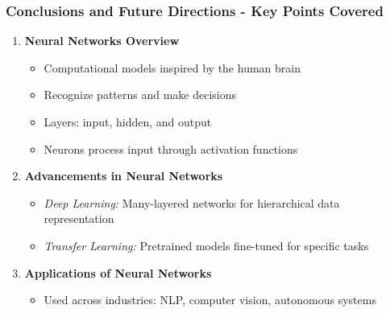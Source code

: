 \documentclass[aspectratio=169]{beamer}
\begin{document}
\begin{frame}[fragile]
    \frametitle{Conclusions and Future Directions - Key Points Covered}
    \begin{enumerate}
        \item \textbf{Neural Networks Overview}
        \begin{itemize}
            \item Computational models inspired by the human brain
            \item Recognize patterns and make decisions
            \item Layers: input, hidden, and output
            \item Neurons process input through activation functions
        \end{itemize}
        
        \item \textbf{Advancements in Neural Networks}
        \begin{itemize}
            \item \textit{Deep Learning:} Many-layered networks for hierarchical data representation
            \item \textit{Transfer Learning:} Pretrained models fine-tuned for specific tasks
        \end{itemize}
        
        \item \textbf{Applications of Neural Networks}
        \begin{itemize}
            \item Used across industries: NLP, computer vision, autonomous systems
        \end{itemize}
    \end{enumerate}
\end{frame}
\end{document}
